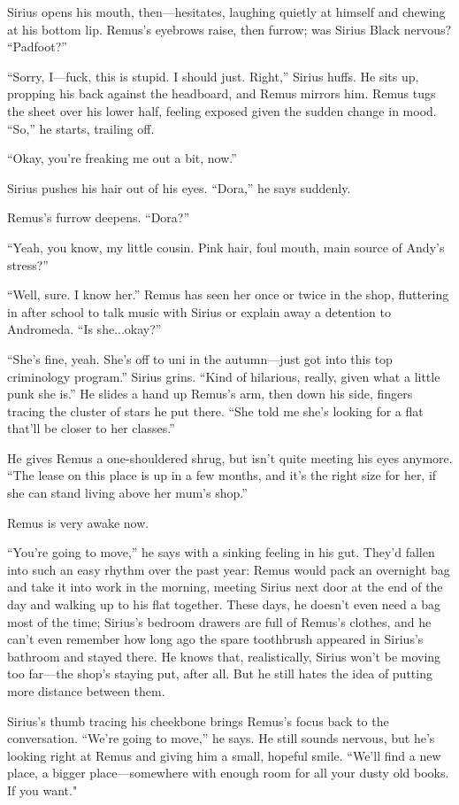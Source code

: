 Sirius opens his mouth, then—hesitates, laughing quietly at himself and chewing at his bottom lip. Remus’s eyebrows raise, then furrow; was Sirius Black nervous? “Padfoot?”

“Sorry, I—fuck, this is stupid. I should just. Right,” Sirius huffs. He sits up, propping his back against the headboard, and Remus mirrors him. Remus tugs the sheet over his lower half, feeling exposed given the sudden change in mood. “So,” he starts, trailing off.

“Okay, you're freaking me out a bit, now.”

Sirius pushes his hair out of his eyes. “Dora,” he says suddenly.

Remus’s furrow deepens. “Dora?”

“Yeah, you know, my little cousin. Pink hair, foul mouth, main source of Andy’s stress?”

“Well, sure. I know her.” Remus has seen her once or twice in the shop, fluttering in after school to talk music with Sirius or explain away a detention to Andromeda. “Is she...okay?”

“She’s fine, yeah. She’s off to uni in the autumn—just got into this top criminology program.” Sirius grins. “Kind of hilarious, really, given what a little punk she is.” He slides a hand up Remus’s arm, then down his side, fingers tracing the cluster of stars he put there. “She told me she’s looking for a flat that’ll be closer to her classes.”

He gives Remus a one-shouldered shrug, but isn’t quite meeting his eyes anymore. “The lease on this place is up in a few months, and it’s the right size for her, if she can stand living above her mum’s shop.”

Remus is very awake now.

“You’re going to move,” he says with a sinking feeling in his gut. They’d fallen into such an easy rhythm over the past year: Remus would pack an overnight bag and take it into work in the morning, meeting Sirius next door at the end of the day and walking up to his flat together. These days, he doesn’t even need a bag most of the time; Sirius’s bedroom drawers are full of Remus’s clothes, and he can’t even remember how long ago the spare toothbrush appeared in Sirius’s bathroom and stayed there. He knows that, realistically, Sirius won’t be moving too far—the shop’s staying put, after all. But he still hates the idea of putting more distance between them.

Sirius’s thumb tracing his cheekbone brings Remus’s focus back to the conversation. “We’re going to move,” he says. He still sounds nervous, but he’s looking right at Remus and giving him a small, hopeful smile. “We’ll find a new place, a bigger place—somewhere with enough room for all your dusty old books. If you want."

